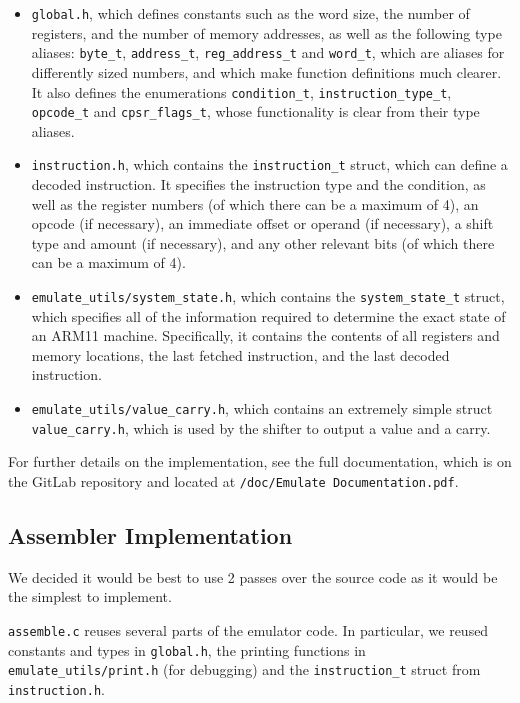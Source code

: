 \documentclass[10pt]{article}
\begin{document}
\begin{itemize}
\item \texttt{global.h}, which defines constants such as the word size, the number of registers, and the number of memory addresses, as well as the following type aliases: \texttt{byte\_t}, \texttt{address\_t}, \texttt{reg\_address\_t} and \texttt{word\_t}, which are aliases for differently sized numbers, and which make function definitions much clearer. It also defines the enumerations \texttt{condition\_t}, \texttt{instruction\_type\_t}, \texttt{opcode\_t} and \texttt{cpsr\_flags\_t}, whose functionality is clear from their type aliases.
\item \texttt{instruction.h}, which contains the \texttt{instruction\_t} struct, which can define a decoded instruction. It specifies the instruction type and the condition, as well as the register numbers (of which there can be a maximum of 4), an opcode (if necessary), an immediate offset or operand (if necessary), a shift type and amount (if necessary), and any other relevant bits (of which there can be a maximum of 4).
\item \texttt{emulate\_utils/system\_state.h}, which contains the \texttt{system\_state\_t} struct, which specifies all of the information required to determine the exact state of an ARM11 machine. Specifically, it contains the contents of all registers and memory locations, the last fetched instruction, and the last decoded instruction.
\item \texttt{emulate\_utils/value\_carry.h}, which contains an extremely simple struct \texttt{value\_carry.h}, which is used by the shifter to output a value and a carry.
\end{itemize}

For further details on the implementation, see the full documentation, which is on the GitLab repository and located at \texttt{/doc/Emulate Documentation.pdf}.

\subsection{Assembler Implementation}

We decided it would be best to use 2 passes over the source code as it would be the simplest to implement.

\texttt{assemble.c} reuses several parts of the emulator code. In particular, we reused constants and types in \texttt{global.h}, the printing functions in \texttt{emulate\_utils/print.h} (for debugging) and the \texttt{instruction\_t} struct from \texttt{instruction.h}.
\end{document}
